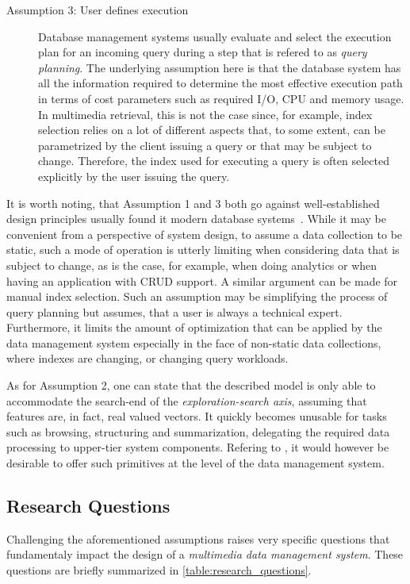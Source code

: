 \begin{description}
    \item[Assumption 3: User defines execution] Database management systems usually evaluate and select the execution plan for an incoming query during a step that is refered to as \emph{query planning}. The underlying assumption here is that the database system has all the information required to determine the most effective execution path in terms of cost parameters such as required I/O, CPU and memory usage. In multimedia retrieval, this is not the case since, for example, index selection relies on a lot of different aspects that, to some extent, can be parametrized by the client issuing a query or that may be subject to change. Therefore, the index used for executing a query is often selected explicitly by the user issuing the query.
\end{description}

It is worth noting, that Assumption 1 and 3 both go against well-established design principles usually found it modern database systems~\cite{Petrov:2019Database}.  While it may be convenient from a perspective of system design, to assume a data collection to be static, such a mode of operation is utterly limiting when considering data that is subject to change, as is the case, for example, when doing analytics or when having an application with CRUD support. A similar argument can be made for manual index selection. Such an assumption may be simplifying the process of query planning but assumes, that a user is always a technical expert. Furthermore, it limits the amount of optimization that can be applied by the data management system especially in the face of non-static data collections, where indexes are changing, or changing query workloads. 

As for Assumption 2, one can state that the described model is only able to accommodate the search-end of the \emph{exploration-search axis}, assuming that features are, in fact, real valued vectors. It quickly becomes unusable for tasks such as browsing, structuring and summarization, delegating the required data processing to upper-tier system components. Refering to \cite{Jonson:2016}, it would however be desirable to offer such primitives at the level of the data management system.

\subsection{Research Questions}

Challenging the aforementioned assumptions raises very specific questions that fundamentaly impact the design of a \emph{multimedia data management system}. These questions are briefly summarized in \cref{table:research_questions}.

